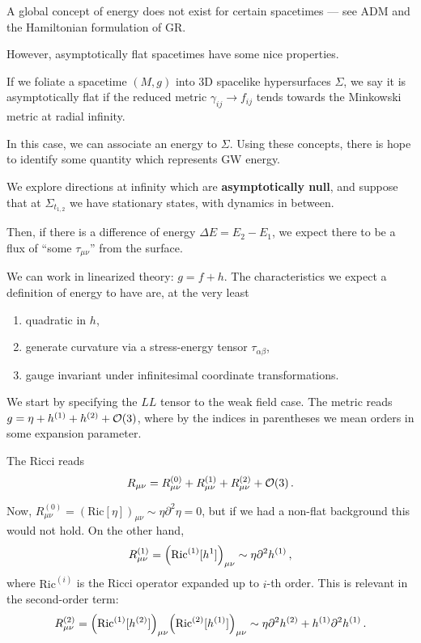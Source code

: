 \documentclass[main.tex]{subfiles}
\begin{document}
A global concept of energy does not exist for certain spacetimes --- see ADM and the Hamiltonian formulation of GR. 

However, asymptotically flat spacetimes have some nice properties.

If we foliate a spacetime \((M, g)\) into 3D spacelike hypersurfaces \(\Sigma \), we say it is asymptotically flat if the reduced metric \(\gamma_{ij} \to f_{ij}\) tends towards the Minkowski metric at radial infinity. 

In this case, we can associate an energy to \(\Sigma \).
Using these concepts, there is hope to identify some quantity which represents GW energy.

We explore directions at infinity which are \textbf{asymptotically null}, and suppose that at \(\Sigma_{t_{1, 2}}\) we have stationary states, with dynamics in between. 

Then, if there is a difference of energy \(\Delta E = E_2 - E_1 \), we expect there to be a flux of ``some \(\tau_{\mu \nu }\)'' from the surface. 

We can work in linearized theory: \(g = f + h\). 
The characteristics we expect a definition of energy to have are, at the very least
\begin{enumerate}
    \item quadratic in \(h\),
    \item generate curvature via a stress-energy tensor \(\tau_{\alpha \beta }\),
    \item gauge invariant under infinitesimal coordinate transformations.  
\end{enumerate}

We start by specifying the \(LL\) tensor to the weak field case. 
The metric reads \(g = \eta + h^{(1)} + h^{(2)} + \order{3}\), where by the indices in parentheses we mean orders in some expansion parameter.

The Ricci reads 
%
\begin{align}
R_{\mu \nu } = 
R_{\mu \nu }^{(0)} + 
R_{\mu \nu }^{(1)} + 
R_{\mu \nu }^{(2)} + 
\order{3}
\,.
\end{align}

Now, \(R_{\mu \nu }^{(0)} = (\text{Ric}[\eta ])_{\mu \nu } \sim \eta \partial^2 \eta  = 0\), but if we had a non-flat background this would not hold. 
On the other hand, 
%
\begin{align}
R^{(1)}_{\mu \nu } = \qty(\text{Ric}^{(1)}[h^{1}])_{\mu \nu } \sim \eta \partial^2 h^{(1)}
\,,
\end{align}
%
where \(\text{Ric}^{(i)}\) is the Ricci operator expanded up to \(i\)-th order. This is relevant in the second-order term: 
%
\begin{align}
R^{(2)}_{\mu \nu } = 
\qty(\text{Ric}^{(1)} [ h^{(2)}])_{\mu \nu }
\qty(\text{Ric}^{(2)} [ h^{(1)}])_{\mu \nu }
\sim
\eta \partial^2 h^{(2)} + h^{(1)} \partial^2 h^{(1)}
\,.
\end{align}
\end{document}
